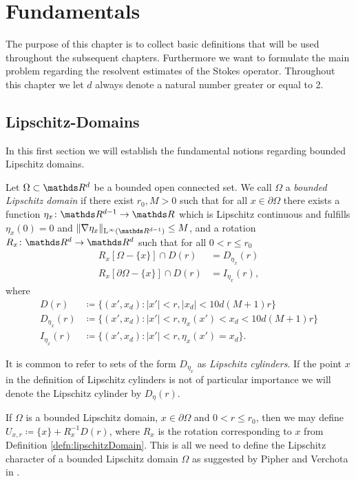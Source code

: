 \chapter{Fundamentals}

The purpose of this chapter is to collect basic definitions that will be used throughout the subsequent chapters. Furthermore we want to formulate the main problem regarding the resolvent estimates of the Stokes operator.
Throughout this chapter we let $d$ always denote a natural number greater or equal to 2.

\section{Lipschitz-Domains}

In this first section we will establish the fundamental notions regarding bounded Lipschitz domains.

\begin{defn}
  \label{defn:lipschitzDomain}
  Let $\Omega \subset \R^d$ be a bounded open connected set.
  We call $\Omega$ a \emph{bounded Lipschitz domain} if there exist $r_0, M > 0$ such that for all $x \in \partial\Omega$ there exists a function $\eta_x \colon \R^{d - 1} \to \R$ which is Lipschitz continuous and fulfills $\eta_x(0) = 0$ and $\|\nabla \eta_x \|_{\Ell^\infty(\R^{d - 1})} \leq M$, and a rotation $R_x \colon \R^d \to \R^d$ such that for all $0 < r \leq r_0$ 
  \begin{align*}
    R_x[ \Omega - \{x\} ] \cap D(r) &= D_{\eta_x}(r) \\
    R_x[\partial\Omega - \{x\}] \cap D(r) &= I_{\eta_x}(r),
  \end{align*}
  where
  \begin{align*}
    D(r) &\coloneqq \{ (x', x_d) \colon |x'| < r, |x_d| < 10 d (M + 1) r\} \\
    D_{\eta_x}(r) &\coloneqq \{ (x', x_d) \colon |x'| < r, \eta_x(x') < x_d < 10 d(M+ 1)r\} \\
    I_{\eta_x}(r) &\coloneqq \{ (x', x_d) \colon |x'| < r, \eta_x(x') = x_d \} .
  \end{align*}
\end{defn}
  It is common to refer to sets of the form $D_{\eta_x}$ as \emph{Lipschitz cylinders}. If the point $x$ in the definition of Lipschitz cylinders is not of particular importance we will denote the Lipschitz cylinder by $D_{\eta}(r)$.

  If $\Omega$ is a bounded Lipschitz domain, $x \in \partial\Omega$ and $0 < r \leq r_0$, then we may define $U_{x,r} \coloneqq \{ x\} + R_x^{-1} D(r)$, where $R_x$ is the rotation corresponding to $x$ from Definition \ref{defn:lipschitzDomain}.
  This is all we need to define the Lipschitz character of a bounded Lipschitz domain $\Omega$ as suggested by Pipher and Verchota in \cite[Sec. 5]{pipherVerchota}.

